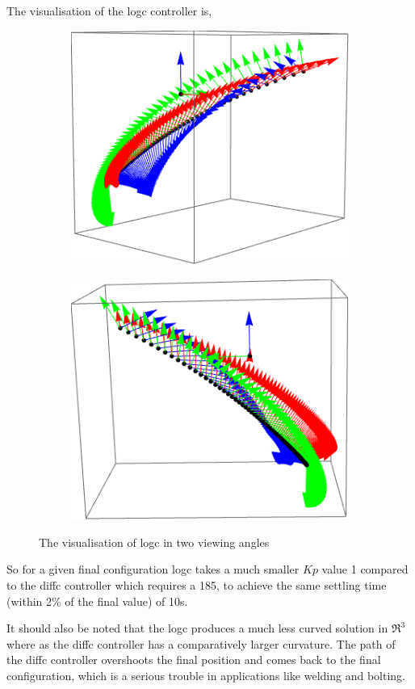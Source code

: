 \documentclass[a4paper,12pt]{article}
\begin{document}
The \SE visualisation of the logc controller is,
\begin{figure}[H]
	\centering
	\begin{subfigure}
		\centering
		\includegraphics[scale=0.5]{logc}
		\label{fg:logc_se}
	\end{subfigure}
	\begin{subfigure}
		\centering
		\includegraphics[scale=0.5]{logc_2}
		\label{fg:logc_se_2}
\end{subfigure}
	\caption{The \SE visualisation of logc in two viewing angles}
\end{figure}

So for a given final configuration logc takes a much smaller $Kp$ value 1 compared to the diffc controller which requires a 185, to achieve the same settling time (within 2\% of the final value) of 10s. 

It should also be noted that the logc produces a much less curved solution in $\Re^3$ where as the diffc controller has a comparatively larger curvature. The path of the diffc controller overshoots the final position and comes back to the final configuration, which is a serious trouble in applications like welding and bolting.
\end{document}
